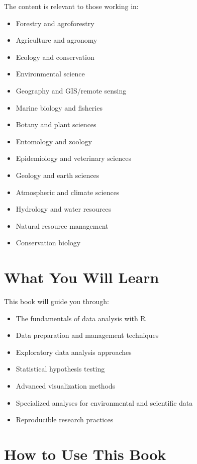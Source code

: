 \documentclass[
  letterpaper,
]{book}
\providecommand{\tightlist}{%
  \setlength{\itemsep}{0pt}\setlength{\parskip}{0pt}}
\begin{document}
The content is relevant to those working in:

\begin{itemize}
\tightlist
\item
  Forestry and agroforestry
\item
  Agriculture and agronomy
\item
  Ecology and conservation
\item
  Environmental science
\item
  Geography and GIS/remote sensing
\item
  Marine biology and fisheries
\item
  Botany and plant sciences
\item
  Entomology and zoology
\item
  Epidemiology and veterinary sciences
\item
  Geology and earth sciences
\item
  Atmospheric and climate sciences
\item
  Hydrology and water resources
\item
  Natural resource management
\item
  Conservation biology
\end{itemize}

\section*{What You Will Learn}\label{what-you-will-learn}


This book will guide you through:

\begin{itemize}
\tightlist
\item
  The fundamentals of data analysis with R
\item
  Data preparation and management techniques
\item
  Exploratory data analysis approaches
\item
  Statistical hypothesis testing
\item
  Advanced visualization methods
\item
  Specialized analyses for environmental and scientific data
\item
  Reproducible research practices
\end{itemize}

\section*{How to Use This Book}\label{how-to-use-this-book}
\end{document}
